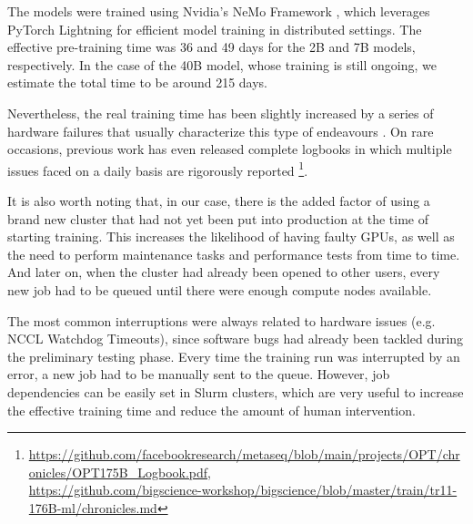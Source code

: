 The models were trained using Nvidia's NeMo Framework \cite{nemo}, which leverages PyTorch Lightning for efficient model training in distributed settings. The effective pre-training time was 36 and 49 days for the 2B and 7B models, respectively. In the case of the 40B model, whose training is still ongoing, we estimate the total time to be around 215 days.

Nevertheless, the real training time has been slightly increased by a series of hardware failures that usually characterize this type of endeavours \cite{opt,bloom,llama3}. On rare occasions, previous work has even released complete logbooks in which multiple issues faced on a daily basis are rigorously reported \footnote{\url{https://github.com/facebookresearch/metaseq/blob/main/projects/OPT/chronicles/OPT175B_Logbook.pdf}, \\ \url{https://github.com/bigscience-workshop/bigscience/blob/master/train/tr11-176B-ml/chronicles.md}}.

It is also worth noting that, in our case, there is the added factor of using a brand new cluster that had not yet been put into production at the time of starting training. This increases the likelihood of having faulty GPUs, as well as the need to perform maintenance tasks and performance tests from time to time. And later on, when the cluster had already been opened to other users, every new job had to be queued until there were enough compute nodes available. 

The most common interruptions were always related to hardware issues (e.g. NCCL Watchdog Timeouts), since software bugs had already been tackled during the preliminary testing phase. Every time the training run was interrupted by an error, a new job had to be manually sent to the queue. However, job dependencies can be easily set in Slurm clusters, which are very useful to increase the effective training time and reduce the amount of human intervention. 